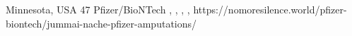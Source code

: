           {
            Minnesota, USA
          }
          {
            47
          }
          {
            Pfizer/BioNTech
          }
          {
            ,
          }
          {
            ,
            ,
            ,
          }
          {
            https://nomoresilence.world/pfizer-biontech/jummai-nache-pfizer-amputations/
          }

